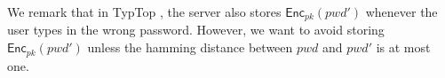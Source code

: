 \begin{itemize}
	
	
	
We remark that in TypTop \cite{CCS:CWPCR17},  the server also stores $ \mathsf{Enc}_{pk}(pwd') $ whenever the user types in the wrong password. However, we want to avoid storing $ \mathsf{Enc}_{pk}(pwd') $ unless the hamming distance between $ pwd $ and $ pwd' $ is at most one.
	

	
	

\end{itemize}
